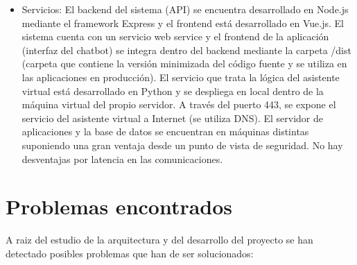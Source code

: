 \begin{itemize}
    \item Servicios: El backend del sistema (API) se encuentra desarrollado en Node.js mediante el framework Express y el frontend está desarrollado en Vue.js. El sistema cuenta con un servicio web service y el frontend de la aplicación (interfaz del chatbot) se integra dentro del backend mediante la carpeta /dist (carpeta que contiene la versión minimizada del código fuente y se utiliza en las aplicaciones en producción). El servicio que trata la lógica del asistente virtual está desarrollado en Python y se despliega en local dentro de la máquina virtual del propio servidor. A través del puerto 443, se expone el servicio del asistente virtual a Internet (se utiliza DNS). El servidor de aplicaciones y la base de datos se encuentran en máquinas distintas suponiendo una gran ventaja desde un punto de vista de seguridad. No hay desventajas por latencia en las comunicaciones.
\end{itemize}




\section{Problemas encontrados}

A raiz del estudio de la arquitectura y del desarrollo del proyecto se han detectado posibles problemas que han de ser solucionados:

